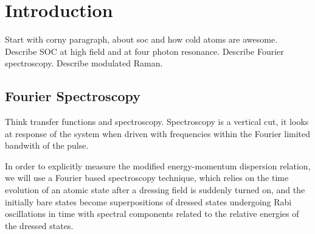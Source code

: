 \section{Introduction}






Start with corny paragraph, about soc and how cold atoms are awesome.
Describe SOC at high field and at four photon resonance. Describe Fourier spectroscopy. Describe modulated Raman. 
 

\subsection{Fourier Spectroscopy}		


Think transfer functions and spectroscopy. Spectroscopy is a vertical cut, it looks at response of the system when driven with frequencies within the Fourier limited bandwith of the pulse. 


In order to explicitly measure the modified energy-momentum dispersion relation, we will use a Fourier based spectroscopy technique, which relies on the time evolution of an atomic state after a dressing field is suddenly turned on, and the initially bare states become superpositions of dressed states undergoing Rabi oscillations in time  with spectral components related to the relative energies of the dressed states. 

